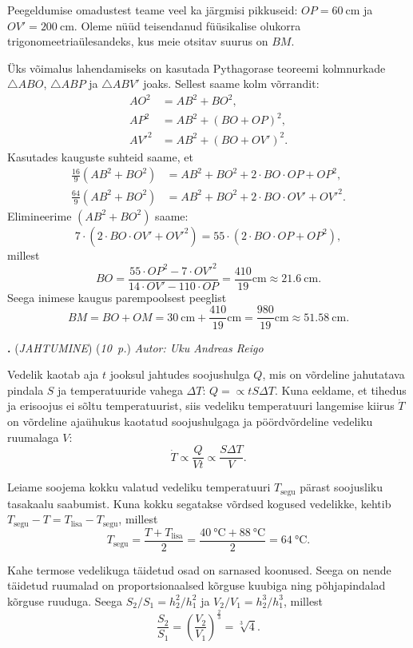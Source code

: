 \documentclass[11pt,a5paper]{article}
\newcommand{\numb}[1]{\vspace{5pt}\textbf{\large #1}}
\newcommand{\nimi}[1]{(\textsl{\small \uppercase{#1}})}
\newcommand{\punktid}[1]{(\emph{#1~p.})}
\newcounter{ylesanne}
\newcommand{\yl}[1]{\addtocounter{ylesanne}{1}\numb{\theylesanne.} \nimi{#1} \newblock{}}
\newcommand{\autor}[1]{\emph{Autor: #1}}%
\begin{document}
Peegeldumise omadustest teame veel ka järgmisi pikkuseid: $OP = \SI{60}{\cm}$ ja $OV' = \SI{200}{\cm}$. Oleme nüüd teisendanud füüsikalise olukorra trigonomeetriaülesandeks, kus meie otsitav suurus on $BM$.

Üks võimalus lahendamiseks on kasutada Pythagorase teoreemi kolmnurkade $\triangle ABO$, $\triangle ABP$ ja $\triangle ABV'$ joaks. Sellest saame kolm võrrandit:
\begin{align*}
  AO^2 &= AB^2 + BO^2,\\
  AP^2 &= AB^2 + (BO + OP)^2,\\
  AV'^2 &= AB^2 + (BO + OV')^2.
\end{align*}
Kasutades kauguste suhteid saame, et
\begin{align*}
  \frac{16}{9} (AB^2 + BO^2) &= AB^2 + BO^2 + 2 \cdot BO \cdot OP + OP^2,\\
  \frac{64}{9} (AB^2 + BO^2) &= AB^2 + BO^2 + 2 \cdot BO \cdot OV' + OV'^2.
\end{align*}
Elimineerime $(AB^2 + BO^2)$ saame:
\[
  7 \cdot ( 2 \cdot BO \cdot OV' + OV'^2) = 55 \cdot (2 \cdot BO \cdot OP + OP^2),
\]
millest
\[
  BO = \frac{55 \cdot OP^2 - 7 \cdot OV'^2}{14 \cdot OV' - 110 \cdot OP} = \frac{410}{19} \si{\cm} \approx \SI{21.6}{\cm}.
\]
Seega inimese kaugus parempoolsest peeglist
\[
  BM = BO + OM = \SI{30}{\cm} + \frac{410}{19} \si{\cm} = \frac{980}{19} \si{\cm} \approx \SI{51.58}{\cm}.
\]


\yl{Jahtumine}
\punktid{10} \autor{Uku Andreas Reigo}

Vedelik kaotab aja $t$ jooksul jahtudes soojushulga $Q$, mis on võrdeline jahutatava pindala $S$ ja temperatuuride vahega $\Delta T$: $Q = \propto  t S \Delta T$. Kuna eeldame, et tihedus ja erisoojus ei sõltu temperatuurist, siis vedeliku temperatuuri langemise kiirus $\dot{T}$ on võrdeline ajaühukus kaotatud soojushulgaga ja pöördvõrdeline vedeliku ruumalaga $V$:
\[
\dot{T} \propto \frac{Q}{Vt} \propto \frac{S \Delta T}{V}.
\]

Leiame soojema kokku valatud vedeliku temperatuuri $T_\text{segu}$ pärast soojusliku tasakaalu saabumist. Kuna kokku segatakse võrdsed kogused vedelikke, kehtib $T_\text{segu}-T = T_\text{lisa}-T_\text{segu}$, millest
\[
  T_\text{segu} = \frac{T+T_\text{lisa}}{2} = \frac{\SI{40}{\celsius}+\SI{88}{\celsius}}{2}=\SI{64}{\celsius}.
  \]

Kahe termose vedelikuga täidetud osad on sarnased koonused. Seega on nende täidetud ruumalad on proportsionaalsed kõrguse kuubiga ning põhjapindalad kõrguse ruuduga. Seega $S_2/S_1=h_2^2/h_1^2$ ja $V_2/V_1=h_2^3/h_1^3$, millest
\[
  \frac{S_2}{S_1}=\left(\frac{V_2}{V_1}\right)^{\frac{2}{3}} = \sqrt[3]{4}.
\]
\end{document}
